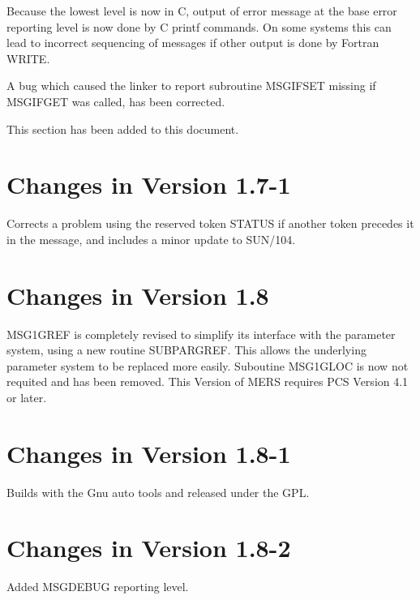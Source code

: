 \documentclass[twoside,11pt]{article}
\newcommand{\xlabel}[1]{}
\renewcommand{\_}{\texttt{\symbol{95}}}
\begin{document}
Because the lowest level is now in C, output of error message at the base
error reporting level is now done by C printf commands. On some systems this
can lead to incorrect sequencing of messages if other output is done by
Fortran WRITE.

A bug which caused the linker to report subroutine MSG\_IFSET missing if
MSG\_IFGET was called, has been corrected.

This section has been added to this document.

\section{\xlabel{changes_in_version_1_7_1}Changes in Version 1.7-1}

Corrects a problem using the reserved token STATUS if another token precedes
it in the message, and includes a minor update to SUN/104.

\section{\xlabel{changes_in_version_1_8}Changes in Version 1.8}

MSG1\_GREF is completely revised to simplify its interface with the parameter
system, using a new routine SUBPAR\_GREF. This allows the underlying parameter
system to be replaced more easily. Suboutine MSG1\_GLOC is now not requited and
has been removed. This Version of MERS requires PCS Version 4.1 or later.

\section{\xlabel{changes_in_version_1_8_1}Changes in Version 1.8-1}

Builds with the Gnu auto tools and released under the GPL.

\section{\xlabel{changes_in_version_1_8_2}Changes in Version 1.8-2}

Added MSG\_\_DEBUG reporting level.


\end{document}
